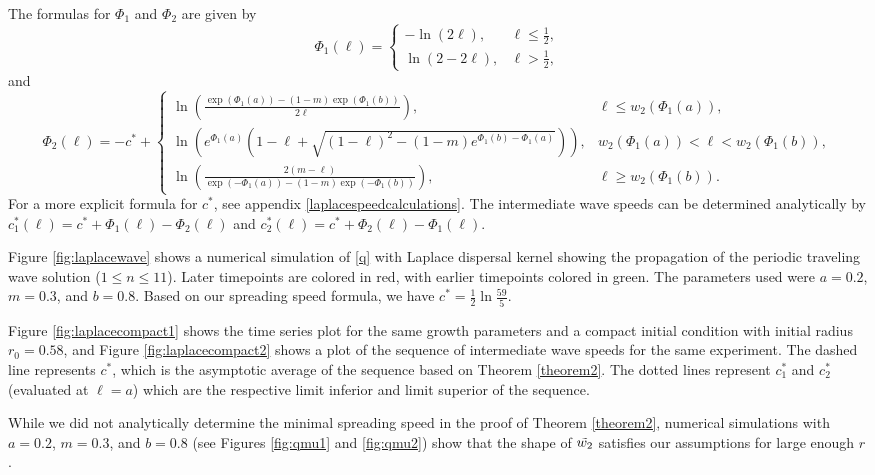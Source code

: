 \documentclass[11pt]{article}
\theoremstyle{definition}
\numberwithin{equation}{section}
\numberwithin{thm}{section}
\renewcommand{\a}{a}
\renewcommand{\b}{b}
\newcommand{\m}{m}
\newcommand{\mtwo}{1}
\begin{document}
The formulas for $\Phi_1$ and $\Phi_2$ are given by
\begin{equation}
\Phi_1(\ell) = \begin{cases} -\ln(2\ell), &\ell\leq \frac{1}{2}, \\ \ln(2-2\ell), & \ell > \frac{1}{2}, \end{cases}
\end{equation}
and
\begin{equation}
\Phi_2(\ell) = -c^* + \begin{cases}
\ln \left( \frac{\exp(\Phi_1(\a)) -(\mtwo-\m)\exp(\Phi_1(\b))}{2\ell} \right), & \ell \leq w_2(\Phi_1(\a)), \\
\ln \left( e^{\Phi_1(\a)} \left( \mtwo - \ell+ \sqrt{(\mtwo-\ell)^2-(\mtwo-\m)e^{\Phi_1(\b)-\Phi_1(\a)}}\right)\right), & w_2(\Phi_1(\a)) < \ell < w_2(\Phi_1(\b)), \\
\ln \left( \frac{2(\m-\ell)}{\exp(-\Phi_1(\a))-(\mtwo-\m)\exp(-\Phi_1(\b))}\right), & \ell\geq w_2(\Phi_1(\b)).
\end{cases}
\end{equation}
For a more explicit formula for $c^*$, see appendix \ref{laplacespeedcalculations}. The intermediate wave speeds can be determined analytically by $c_1^*(\ell) = c^* + \Phi_1(\ell) - \Phi_2(\ell)$ and $c_2^*(\ell)=c^* + \Phi_2(\ell) - \Phi_1(\ell)$.

Figure \ref{fig:laplacewave} shows a numerical simulation of \eqref{q} with Laplace dispersal kernel showing the propagation of the periodic traveling wave solution ($1 \leq n \leq 11$). Later timepoints are colored in red, with earlier timepoints colored in green. The parameters used were $\a=0.2$, $\m=0.3$, and $\b=0.8$. Based on our spreading speed formula, we have $c^*=\frac{1}{2}\ln\frac{59}{5}$.

Figure \ref{fig:laplacecompact1} shows the time series plot for the same growth parameters and a compact initial condition with initial radius $r_0 = 0.58$, and Figure \ref{fig:laplacecompact2} shows a plot of the sequence of intermediate wave speeds for the same experiment. The dashed line represents $c^*$, which is the asymptotic average of the sequence based on Theorem \ref{theorem2}. The dotted lines represent $c_1^*$ and $c_2^*$ (evaluated at $\ell=\a$) which are the respective limit inferior and limit superior of the sequence.

While we did not analytically determine the minimal spreading speed in the proof of Theorem \ref{theorem2}, numerical simulations with  $\a=0.2$, $\m=0.3$, and $\b=0.8$ (see Figures  \ref{fig:qmu1} and \ref{fig:qmu2}) show that the shape of $\tilde{w_2}$ satisfies our assumptions for large enough $r$.
\end{document}
